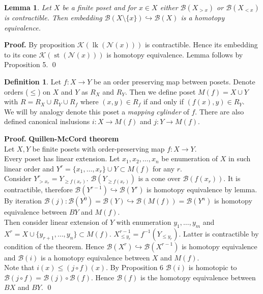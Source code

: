 \documentclass[a4paper, 12pt]{article}
\newtheorem{lemma}{Lemma}
\theoremstyle{definition}
\newtheorem{definition}{Definition}
\theoremstyle{remark}
\newenvironment{pf}{\noindent\textbf{Proof.}}{\qed}
\newcommand{\define}[1]{{\textit{#1}}}
\renewcommand{\leq}{\leqslant}
\renewcommand{\geq}{\geqslant}
\begin{document}
\begin{lemma}
  Let $X$ be a finite poset and for $x \in X$ either $\mathcal{B}(X_{>x})$ or $\mathcal{B}(X_{<x})$ is contractible. Then embedding $\mathcal{B}(X \setminus \{x\}) \hookrightarrow \mathcal{B}(X)$ is a homotopy equivalence.
\end{lemma}

\begin{pf}
  By proposition $\mathcal{K}(\operatorname{lk}(\mathcal{N}(x)))$ is contractible. Hence its embedding to its cone $\mathcal{K}(\operatorname{st}(\mathcal{N}(x)))$ is homotopy equivalence. Lemma follows by Proposition 5.
\end{pf}

\begin{definition}
  Let $f : X \to Y$ be an order preserving map between posets. Denote orders ($\leq$) on $X$ and $Y$ as $R_X$ and $R_Y$. Then we define poset $M(f) = X \cup Y$ with $R = R_X \cup R_Y \cup R_{f}$ where $(x,y) \in R_f$ if and only if $(f(x),y) \in R_Y$.\\

  We will by analogy denote this poset a \define{mapping cylinder} of $f$. There are also defined canonical inslusions $i : X \to M(f)$ and $j : Y \to M(f)$.
\end{definition}

\begin{pf} \textbf{Quillen-McCord theorem}\\
  Let $X, Y$ be finite posets with order-preserving map $f : X \to Y$.\\

  Every poset has linear extension. Let $x_1, x_2, \ldots, x_n$ be enumeration of $X$ in such linear order and $Y^r = \{x_1,\ldots,x_r\} \cup Y \subset M(f)$ for any $r$.\\

  Consider $Y^r_{>x_r} = Y_{\geq f(x_r)}$. $\mathcal{B}(Y_{\geq f(x_r)})$ is a cone over $\mathcal{B}(f(x_r))$. It is contractible, therefore $\mathcal{B}(Y^{r-1}) \hookrightarrow \mathcal{B}(Y^{r})$ is homotopy equivalence by lemma. By iteration $\mathcal{B}(j) : \mathcal{B}(Y^{0}) = \mathcal{B}(Y) \hookrightarrow \mathcal{B}(M(f)) = \mathcal{B}(Y^n)$ is homotopy equivalence between $BY$ and $M(f)$.\\

  Then consider linear extension of $Y$ with enumeration $y_1,\ldots,y_m$ and $X^r = X \cup \{y_{r+1},\ldots,y_n\} \subset M(f)$. $X^{r-1}_{\leq y_r} = f^{-1}(Y_{\leqslant y_r})$. Latter is contractible by condition of the theorem. Hence $\mathcal{B}(X^{r}) \hookrightarrow \mathcal{B}(X^{r-1})$ is homotopy equivalence and $\mathcal{B}(i)$ is a homotopy equivalence between $X$ and $M(f)$.\\

  Note that $i(x) \leqslant (j \circ f)(x)$. By Proposition 6 $\mathcal{B}(i)$ is homotopic to $\mathcal{B}(j \circ f) = \mathcal{B}(j) \circ \mathcal{B}(f)$. Hence $\mathcal{B}(f)$ is the homotopy equivalence between $BX$ and $BY$.
\end{pf}
\end{document}
